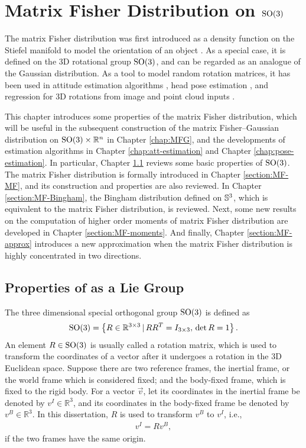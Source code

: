 
\chapter{Matrix Fisher Distribution on $\mathrm{SO}(3)$} \label{chap:MF}

The matrix Fisher distribution was first introduced as a density function on the Stiefel manifold to model the orientation of an object \cite{downs1972orientation}.
As a special case, it is defined on the 3D rotational group $\mathrm{SO}(3)$, and can be regarded as an analogue of the Gaussian distribution.
As a tool to model random rotation matrices, it has been used in attitude estimation algorithms \cite{lee2018bayesian}, head pose estimation \cite{liu2021mfdnet}, and regression for 3D rotations from image and point cloud inputs \cite{mohlin2020probabilistic,yin2022fishermatch}.

This chapter introduces some properties of the matrix Fisher distribution, which will be useful in the subsequent construction of the matrix Fisher--Gaussian distribution on $\mathrm{SO}(3)\times \mathbb{R}^n$ in Chapter \ref{chap:MFG}, and the developments of estimation algorithms in Chapter \ref{chap:att-estimation} and Chapter \ref{chap:pose-estimation}.
In particular, Chapter \ref{section:MF-SO(3)} reviews some basic properties of $\mathrm{SO}(3)$.
The matrix Fisher distribution is formally introduced in Chapter \ref{section:MF-MF}, and its construction and properties are also reviewed.
In Chapter \ref{section:MF-Bingham}, the Bingham distribution defined on $\mathbb{S}^3$, which is equivalent to the matrix Fisher distribution, is reviewed.
Next, some new results on the computation of higher order moments of matrix Fisher distribution are developed in Chapter \ref{section:MF-moments}.
And finally, Chapter \ref{section:MF-approx} introduces a new approximation when the matrix Fisher distribution is highly concentrated in two directions.

\section{Properties of  as a Lie Group} \label{section:MF-SO(3)}

The three dimensional special orthogonal group $\mathrm{SO}(3)$ is defined as
\begin{align}
	\mathrm{SO}(3) = \left\{ R\in\mathbb{R}^{3\times 3} \,|\, RR^T = I_{3\times 3},\, \det R = 1 \right\}.
\end{align}
An element $R\in\mathrm{SO}(3)$ is usually called a rotation matrix, which is used to transform the coordinates of a vector after it undergoes a rotation in the 3D Euclidean space.
Suppose there are two reference frames, the inertial frame, or the world frame which is considered fixed; and the body-fixed frame, which is fixed to the rigid body.
For a vector $\vec{v}$, let its coordinates in the inertial frame be denoted by $v^I \in \mathbb{R}^3$, and its coordinates in the body-fixed frame be denoted by $v^B \in \mathbb{R}^3$.
In this dissertation, $R$ is used to transform $v^B$ to $v^I$, i.e.,
\begin{align}
	v^I = Rv^B,
\end{align}
if the two frames have the same origin.

